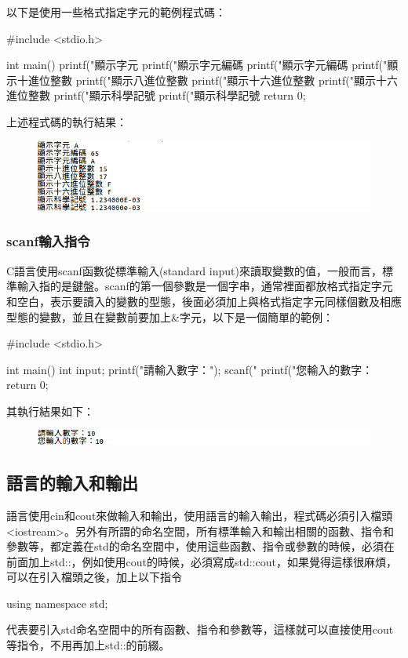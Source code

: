 以下是使用一些格式指定字元的範例程式碼：
\begin{cppcode}
#include <stdio.h>

int main() 
{
	printf("顯示字元 %
	printf("顯示字元編碼 %
	printf("顯示字元編碼 %
	printf("顯示十進位整數 %
	printf("顯示八進位整數 %
	printf("顯示十六進位整數 %
	printf("顯示十六進位整數 %
	printf("顯示科學記號 %
	printf("顯示科學記號 %
	return 0;
}
\end{cppcode}
上述程式碼的執行結果：
\begin{figure}[H]
	\centering
	\includegraphics[width=17cm]{fig/cpp_io/HW007}
\end{figure}

\subsubsection {scanf輸入指令}
C語言使用scanf函數從標準輸入(standard input)來讀取變數的值，一般而言，標準輸入指的是鍵盤。scanf的第一個參數是一個字串，通常裡面都放格式指定字元和空白，表示要讀入的變數的型態，後面必須加上與格式指定字元同樣個數及相應型態的變數，並且在變數前要加上\&字元，以下是一個簡單的範例：
\begin{cppcode}
#include <stdio.h>

int main() {
	int input;
	printf("請輸入數字：");
	scanf("%
	printf("您輸入的數字：%
	return 0;
}
\end{cppcode}
其執行結果如下：
\begin{figure}[H]
	\includegraphics[width=17cm]{fig/cpp_io/HW008}
\end{figure}


\subsection{\cc{}語言的輸入和輸出}
\cc{}語言使用cin和cout來做輸入和輸出，使用\cc{}語言的輸入輸出，程式碼必須引入檔頭<iostream>。另外\cc{}有所謂的命名空間，所有標準輸入和輸出相關的函數、指令和參數等，都定義在std的命名空間中，使用這些函數、指令或參數的時候，必須在前面加上std::，例如使用cout的時候，必須寫成std::cout，如果覺得這樣很麻煩，可以在引入檔頭之後，加上以下指令
\begin{inside}
	using namespace std;
\end{inside}
代表要引入std命名空間中的所有函數、指令和參數等，這樣就可以直接使用cout等指令，不用再加上std::的前綴。

